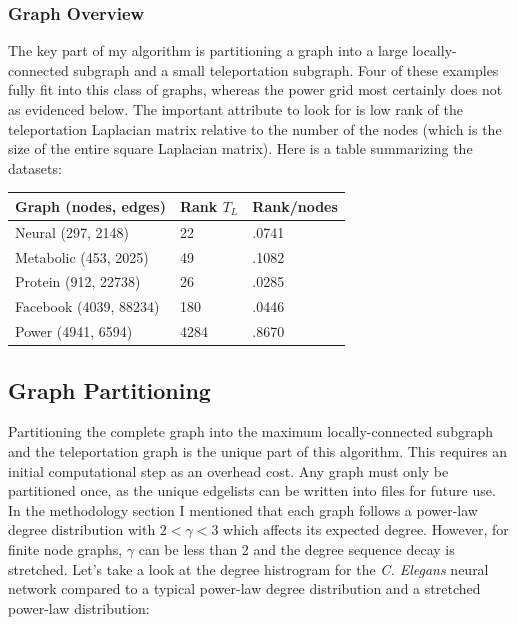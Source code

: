 \documentclass{article}
\begin{document}
\subsubsection{Graph Overview}
The key part of my algorithm is partitioning a graph into a large locally-connected subgraph and a small teleportation subgraph. Four of these examples fully fit into this class of graphs, whereas the power grid most certainly does not as evidenced below. The important attribute to look for is low rank of the teleportation Laplacian matrix relative to the number of the nodes (which is the size of the entire square Laplacian matrix). Here is a table summarizing the datasets:

\begin{spacing}{1}
\begin{center}
\renewcommand{\arraystretch}{1.5}
    \begin{tabular}{| l | l | l |}
    \hline
    Graph (nodes, edges) & Rank $T_L$ & Rank/nodes \\ \hline
    Neural (297, 2148) & 22 & .0741 \\ \hline
    Metabolic (453, 2025) & 49 & .1082 \\  \hline
    Protein (912, 22738) & 26 & .0285 \\ \hline
    Facebook (4039, 88234) & 180 & .0446 \\ \hline
    Power (4941, 6594) & 4284 & .8670 \\ 
    \hline
    \end{tabular}
\end{center}
\end{spacing}

\subsection{Graph Partitioning}
Partitioning the complete graph into the maximum locally-connected subgraph and the teleportation graph is the unique part of this algorithm. This requires an initial computational step as an overhead cost. Any graph must only be partitioned once, as the unique edgelists can be written into files for future use. In the methodology section I mentioned that each graph follows a power-law degree distribution with $2 < \gamma < 3$ which affects its expected degree. However, for finite node graphs, $\gamma$ can be less than 2 and the degree sequence decay is stretched. Let's take a look at the degree histrogram for the \textit{C. Elegans} neural network compared to a typical power-law degree distribution and a stretched power-law distribution:
\end{document}
